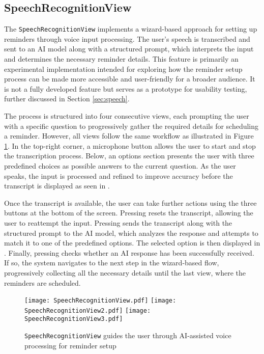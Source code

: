 \subsection{SpeechRecognitionView}
\label{sec:speechview}
The \lstinline{SpeechRecognitionView} implements a wizard-based approach for setting up reminders through voice input processing. 
The user's speech is transcribed and sent to an AI model along with a structured prompt, which interprets the input and determines the necessary reminder details.
This feature is primarily an experimental implementation intended for exploring how the reminder setup process can be made more accessible and user-friendly for a broader audience. 
It is not a fully developed feature but serves as a prototype for usability testing, further discussed in Section \ref{sec:speech}.

The process is structured into four consecutive views, each prompting the user with a specific question to progressively gather the required details for scheduling a reminder.
However, all views follow the same workflow as illustrated in Figure \ref{fig:speechrecognitionview}.
In the top-right corner, a microphone button  allows the user to start and stop the transcription process. 
Below, an options section  presents the user with three predefined choices as possible answers to the current question. 
As the user speaks, the input is processed and refined to improve accuracy before the transcript is displayed as seen in .

Once the transcript is available, the user can take further actions using the three buttons at the bottom of the screen. 
Pressing  resets the transcript, allowing the user to reattempt the input. 
Pressing  sends the transcript along with the structured prompt to the AI model, which analyzes the response and attempts to match it to one of the predefined options. 
The selected option is then displayed in . 
Finally, pressing  checks whether an AI response has been successfully received. 
If so, the system navigates to the next step in the wizard-based flow, progressively collecting all the necessary details until the last view, where the reminders are scheduled.

\begin{figure}[htbp]
    \centering
    \texttt{[image: SpeechRecognitionView.pdf]}
    \qquad
    \texttt{[image: SpeechRecognitionView2.pdf]}
    \qquad
    \texttt{[image: SpeechRecognitionView3.pdf]}
    \caption{\lstinline{SpeechRecognitionView} guides the user through AI-assisted voice processing for reminder setup}
    \label{fig:speechrecognitionview}
\end{figure}


